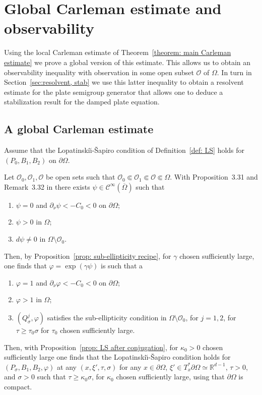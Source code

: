 \documentclass[JEP,XML,SOM,Unicode,published]{cedram}
\theoremstyle{plain}
\theoremstyle{definition}
\def\R{\mathbb{R}}
\newcommand{\LS}{Lopatinski\u{\i}-\v{S}apiro\xspace}
\newcommand{\suff}{sufficiently\xspace}
\let\csp\gamma
\let\k\kappa
\newcommand{\ovl}[1]{\overline{#1}}
\newcommand{\scrO}{\mathscr O}
\newcommand{\Psig}{P_{\sigma}}
\newcommand{\Qsig}{Q_{\sigma}}
\newcommand{\Con}{\ensuremath{\mathscr C}}
\newcommand{\Cinf}{\ensuremath{\Con^\infty}}
\begin{document}
\section{Global Carleman estimate and observability}
\label{sec: Global Carleman estimate}
Using the local Carleman estimate of Theorem~\ref{theorem: main Carleman
estimate} we prove a global version of this estimate.
This allows us to obtain an observability inequality with observation in some open subset
$\scrO$ of $\Omega$.
In turn in Section~\ref{sec:resolvent, stab} we use this
latter inequality to obtain a resolvent estimate for the plate
semigroup generator that allows one to deduce a stabilization result
for the damped plate equation.

\subsection{A global Carleman estimate}
Assume that the \LS condition of Definition~\ref{def: LS} holds for $(P_0, B_1, B_2)$ on $\partial
\Omega$.

Let $\scrO_0, \scrO_1, \scrO$ be open sets such that $\scrO_0 \Subset \scrO_1\Subset \scrO \Subset\Omega$. With
Proposition~3.31 and Remark~3.32 in \cite{JGL-vol1} there exists $\psi
\in \Cinf(\ovl{\Omega})$ such that
\begin{enumerate}
\item $\psi = 0$ and $\partial_\nu \psi <- C_0<0$ on $\partial \Omega$;
\item $\psi >0$ in $\Omega$;
\item $d \psi \neq 0$ in $\Omega \setminus \scrO_0$.
\end{enumerate}
Then, by Proposition~\ref{prop: sub-ellipticity recipe}, for $\csp$
chosen \suff large, one finds that $\varphi = \exp(\csp \psi)$ is such
that a
\begin{enumerate}
\item $\varphi = 1$ and $\partial_\nu \varphi <- C_0<0$ on $\partial \Omega$;
\item $\varphi >1$ in $\Omega$;
\item $(\Qsig^j,\varphi)$ satisfies the sub-ellipticity condition in
$\Omega \setminus \scrO_0$, for $j=1,2$, for $\tau \geq \tau_0
\sigma$ for $\tau_0$ chosen \suff large.
\end{enumerate}
Then, with Proposition~\ref{prop: LS after conjugation}, for $\k_0>0$
chosen \suff large one finds that the \LS condition holds for
$(\Psig, B_1, B_2, \varphi)$ at any
$(x,\xi',\tau,\sigma)$ for any $x \in \partial \Omega$, $\xi' \in
T_x^* \partial \Omega \simeq \R^{d-1}$, $\tau>0$, and $\sigma>0$ such that $\tau \geq
\k_0 \sigma$, for $\k_0$ chosen \suff large, using that $\partial
\Omega$ is compact.
\end{document}
